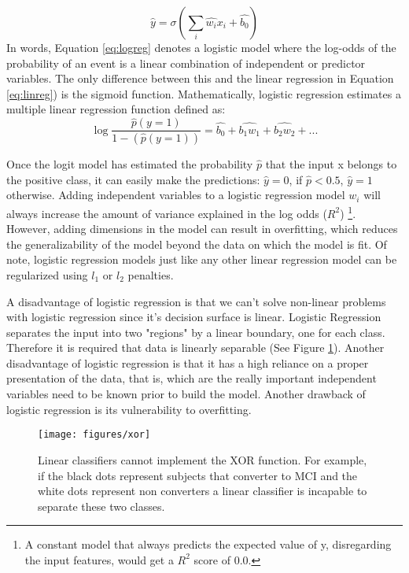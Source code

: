 \documentclass[11pt]{article}
\theoremstyle{definition}
\theoremstyle{remark}
\begin{document}
\begin{equation}
\hat{y} = \sigma(\sum_i \hat{w_i}x_i +\hat{b_0})
\label{eq:logreg}
\end{equation}
In words, Equation \ref{eq:logreg} denotes a logistic model where the log-odds of the probability of an event is a linear combination of independent or predictor variables. The only difference between this and the linear regression in Equation \ref{eq:linreg}) is the sigmoid function. Mathematically, logistic regression estimates a multiple linear regression function defined as:
\begin{equation}
\log \frac{\hat{p}(y=1)}{1-(\hat{p}(y=1))} = \hat{b_0} + \hat{b_1w_1} + \hat{b_2w_2} + ...
\label{eq:logreg2}
\end{equation}

Once the logit model has estimated the probability $\hat{p}$ that the input x belongs to the positive class, it can easily make the predictions: $\hat{y} = 0$, if $\hat{p} < 0.5$, $\hat{y} = 1$ otherwise. Adding independent variables to a logistic regression model $w_i$ will always increase the amount of variance explained in the log odds ($R^2$) \footnote{A constant model that always predicts the expected value of y, disregarding the input features, would get a $R^2$ score of 0.0.}. However, adding dimensions in the model can result in overfitting, which reduces the generalizability of the model beyond the data on which the model is fit. Of note, logistic regression models just like any other linear regression model can be regularized using $l_1$ or $l_2$ penalties. 

A disadvantage of logistic regression is that we can’t solve non-linear problems with logistic regression since it’s decision surface is linear. Logistic Regression separates the input into two "regions" by a linear boundary, one for each class. Therefore it is required that data is linearly separable (See Figure \ref{fig:xor}). Another disadvantage of logistic regression is that it has a high reliance on a proper presentation of the data, that is, which are the really important independent variables need to be known prior to build the model. 
Another drawback of logistic regression is its vulnerability to overfitting.

\begin{figure}[H]
        \centering
        \texttt{[image: figures/xor]}
        \caption{Linear classifiers cannot implement the XOR function. For example, if the black dots represent subjects that converter to MCI  and the white dots represent non converters a linear classifier is incapable to separate these two classes.} \label{fig:xor}
\end{figure}
\end{document}
